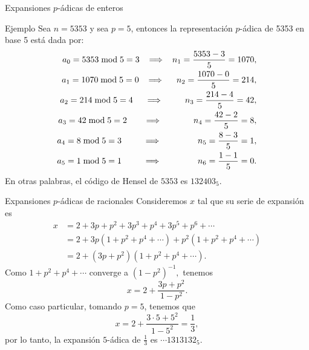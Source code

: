 \documentclass{beamer}
\theoremstyle{definition}
\numberwithin{equation}{section}
\begin{document}
\begin{frame}{Expansiones $p$-ádicas de enteros}
\begin{exampleblock}{Ejemplo}
	Sea $n=5353$ y sea $p=5$, entonces la representación $p$-ádica de 5353 en base 5 está dada por:
	\begin{align*}
	a_0 =5353\bmod5 = 3 \hspace{3mm} \Longrightarrow \hspace{3mm} n_1 = \frac{5353-3}{5}=1070,\\
	a_1 =1070\bmod 5=0 \hspace{3mm} \Longrightarrow \hspace{5mm}n_2 = \frac{1070-0}{5}=214,\\
	a_2 =214\bmod 5=4 \hspace{5mm} \Longrightarrow \hspace{9mm}n_3 = \frac{214-4}{5}=42,\\
	a_3 =42 \bmod 5=2 \hspace{7mm} \Longrightarrow \hspace{13mm}n_4 = \frac{42-2}{5}=8,\\
	a_4 =8 \bmod 5=3 \hspace{9mm} \Longrightarrow \hspace{15mm}n_5 = \frac{8-3}{5}=1,\\
	a_5 =1 \bmod 5=1 \hspace{9mm} \Longrightarrow \hspace{15mm}n_6 = \frac{1-1}{5}=0.
	\end{align*}
	En otras palabras, el código de Hensel de $5353$ es $132403_5$.
\end{exampleblock}
\end{frame}

\begin{frame}{Expansiones $p$-ádicas de racionales}
Consideremos $x$ tal que su serie de expansión es
$$
\begin{aligned}
x &=2+3 p+p^{2}+3 p^{3}+p^{4}+3 p^{5}+p^{6}+\cdots \\
&=2+3 p\left (1+p^{2}+p^{4}+\cdots\right)+p^{2}\left (1+p^{2}+p^{4}+\cdots\right) \\
&=2+\left (3 p+p^{2}\right)\left (1+p^{2}+p^{4}+\cdots\right).
\end{aligned}
$$
Como $1+p^{2}+p^{4}+\cdots$ converge a $\left (1-p^{2}\right)^{-1},$ tenemos
$$
x=2+\frac{3 p+p^{2}}{1-p^{2}}.
$$ 
Como caso particular, tomando $p=5$, tenemos que 
$$
x=2+\frac{3\cdot5+5^{2}}{1-5^{2}}=\frac{1}{3},
$$ 
por lo tanto, la expansión $5$-ádica de $\frac{1}{3}$ es $\cdots1313132_5$.
\end{frame}
\end{document}

